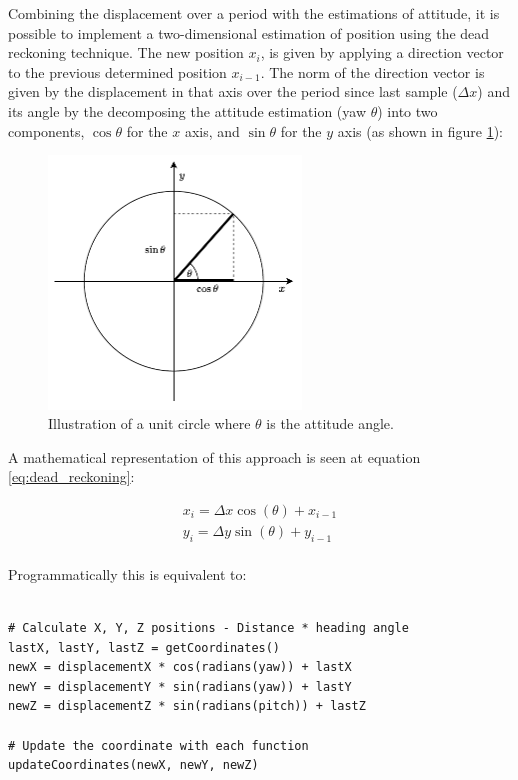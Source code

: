 Combining the displacement over a period with the estimations of attitude, it is possible to implement a two-dimensional estimation of position using the dead reckoning technique. The new position $x_i$, is given by applying a direction vector to the previous determined position $x_{i-1}$. The norm of the direction vector is given by the displacement in that axis over the period since last sample ($\Delta x$) and its angle by the decomposing the attitude estimation (yaw $\theta$) into two components, $\cos \theta$ for the $x$ axis, and $\sin \theta$ for the $y$ axis (as shown in figure \ref{fig:trignometric}):

\begin{figure}[!h]
    \centering
    \includegraphics[width=0.6\textwidth]{figures/trignometric.pdf}
    \caption{Illustration of a unit circle where $\theta$ is the attitude angle.}
    \label{fig:trignometric}
\end{figure}

A mathematical representation of this approach is seen at equation \ref{eq:dead_reckoning}:

\begin{equation}
    \begin{gathered}
        x_i = \Delta x \cos (\theta) + x_{i-1} \\
        y_i = \Delta y \sin (\theta) + y_{i-1} \\
    \end{gathered}
    \label{eq:dead_reckoning}
\end{equation}

Programmatically this is equivalent to:

\lstset{language=Python}
\begin{lstlisting}[frame=single]  % Start your code-block
    
# Calculate X, Y, Z positions - Distance * heading angle
lastX, lastY, lastZ = getCoordinates()
newX = displacementX * cos(radians(yaw)) + lastX
newY = displacementY * sin(radians(yaw)) + lastY
newZ = displacementZ * sin(radians(pitch)) + lastZ 

# Update the coordinate with each function
updateCoordinates(newX, newY, newZ)
    
\end{lstlisting}

